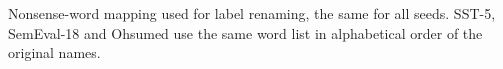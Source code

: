 \begin{table}[t]
  \centering
  \small
  
  \caption{Nonsense-word mapping used for label renaming, the same for all seeds. SST-5, SemEval-18 and Ohsumed use the same word list in alphabetical order of the original names.}
  \label{tab:relabel_words}
\end{table}
